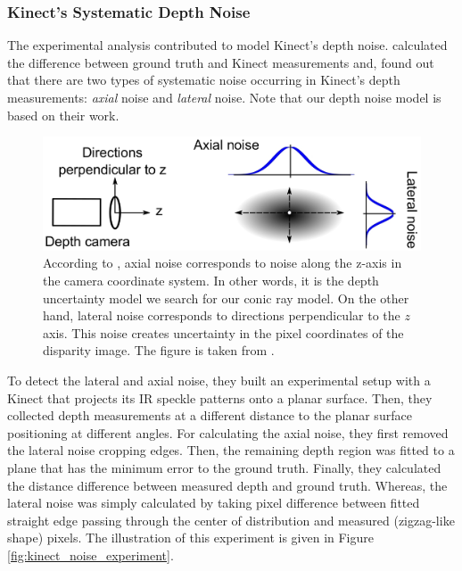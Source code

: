 \documentclass[12pt]{report}
\numberwithin{figure}{section}
\begin{document}
\subsubsection{Kinect's Systematic Depth Noise}

The experimental analysis contributed to model Kinect's depth noise.
\parencite{Nguyen2012a} calculated the difference between ground truth and 
Kinect
measurements and,  found out that there are two types of systematic noise
occurring in Kinect's depth measurements: \textit{axial} noise and
\textit{lateral} noise.  Note that our depth noise model is based on their
work.


\begin{figure}[H] \centering
\includegraphics[width=0.7\linewidth,natwidth=640,natheight=640]
{fig/ref_imgs/kinect_noise_model.png} \caption[Kinect's Depth Noise
Model]{According to \parencite{Nguyen2012a}, axial noise corresponds to noise 
along
the z-axis in the camera coordinate system. In other words, it is the depth
uncertainty model we search for our conic ray model.  On the other hand,
lateral noise corresponds to directions perpendicular to the $z$ axis. This
noise creates uncertainty in the pixel coordinates of the disparity image.
The figure is taken from \parencite{Nguyen2012a}.} 
\label{fig:kinect_noise_model}
\end{figure}

To detect the lateral and axial noise, they built an experimental setup with a
Kinect that projects its IR speckle patterns onto a planar surface.  Then, they
collected depth measurements at a different distance to the planar surface
positioning at different angles.  For calculating the axial noise, they first
removed the lateral noise cropping edges. Then, the remaining depth region was
fitted to a plane that has the minimum error to the ground truth. Finally, they
calculated the distance difference between measured depth and ground truth.
Whereas, the lateral noise was simply calculated by taking pixel difference
between fitted straight edge passing through the center of distribution and
measured (zigzag-like shape) pixels. The illustration of this experiment is
given in Figure \ref{fig:kinect_noise_experiment}.
\end{document}
